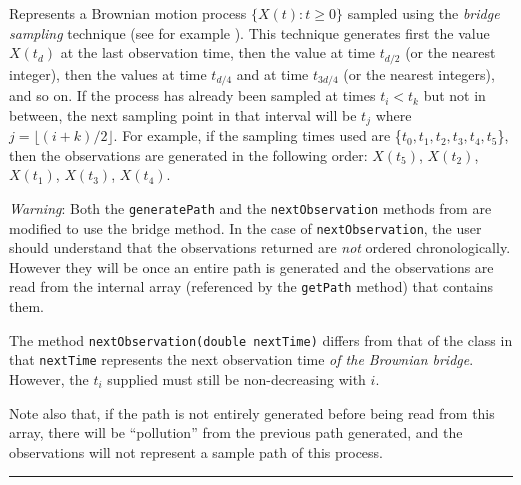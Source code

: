 
Represents a Brownian motion process $\{X(t) : t \geq 0 \}$
sampled using the \emph{bridge sampling} technique
(see for example \cite{fGLA04a}).
This technique generates first the value $X(t_d)$ at the last observation time,
then the value at time $t_{d/2}$ (or the nearest integer),
then the values at time $t_{d/4}$ and at time $t_{3d/4}$
(or the nearest integers), and so on.
If the process has already been sampled at times $t_i < t_k$ but not
in between, the next sampling point in that interval will be
$t_j$ where $j = \lfloor (i + k)/2 \rfloor$.
For example, if the sampling times used are
\{$t_{0}, t_{1}, t_{2}, t_{3}, t_{4}, t_{5}$\},
then the observations are generated in the following order:
$X(t_{5})$, $X(t_{2})$, $X(t_{1})$, $X(t_{3})$, $X(t_{4})$.


\emph{Warning}:
Both the \texttt{generatePath} and the \texttt{nextObservation} methods from
 are
modified to use the bridge method.
In the case of \texttt{nextObservation}, the user should understand
that the observations returned are \emph{not} ordered chronologically.
However they will be once an entire path is generated and the observations
are read from the internal array (referenced by the \texttt{getPath} method)
that contains them.

The method \texttt{nextObservation(double nextTime)} differs from that of
the class
 in that \texttt{nextTime} represents
the next observation time \emph{of the Brownian bridge}.
However, the $t_{i}$ supplied must still be non-decreasing with $i$.

Note also that, if the path is not entirely generated before being read
from this array, there will be ``pollution'' from the previous path generated,
and the observations will not represent a sample path of this process.


\bigskip\hrule\bigskip

